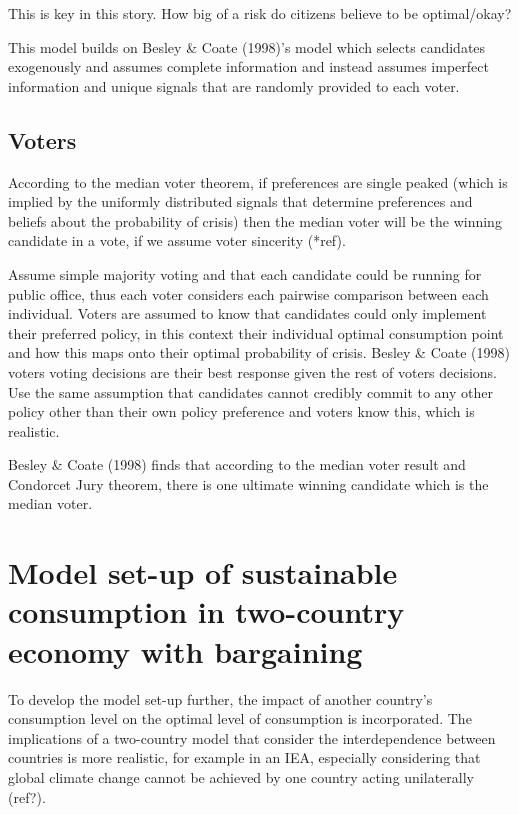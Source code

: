 \documentclass[11pt,preprint, authoryear]{elsarticle}
\numberwithin{equation}{section}
\numberwithin{figure}{section}
\numberwithin{table}{section}
\begin{document}
This is key in this story. How big of a risk do citizens believe to be
optimal/okay?

This model builds on Besley \& Coate (1998)'s model which selects
candidates exogenously and assumes complete information and instead
assumes imperfect information and unique signals that are randomly
provided to each voter.

\hypertarget{voters}{%
\subsection*{Voters}\label{voters}}

According to the median voter theorem, if preferences are single peaked
(which is implied by the uniformly distributed signals that determine
preferences and beliefs about the probability of crisis) then the median
voter will be the winning candidate in a vote, if we assume voter
sincerity (*ref).

Assume simple majority voting and that each candidate could be running
for public office, thus each voter considers each pairwise comparison
between each individual. Voters are assumed to know that candidates
could only implement their preferred policy, in this context their
individual optimal consumption point and how this maps onto their
optimal probability of crisis. Besley \& Coate (1998) voters voting
decisions are their best response given the rest of voters decisions.
Use the same assumption that candidates cannot credibly commit to any
other policy other than their own policy preference and voters know
this, which is realistic.

Besley \& Coate (1998) finds that according to the median voter result
and Condorcet Jury theorem, there is one ultimate winning candidate
which is the median voter.

\hypertarget{model-set-up-of-sustainable-consumption-in-two-country-economy-with-bargaining}{%
\section{Model set-up of sustainable consumption in two-country economy
with
bargaining}\label{model-set-up-of-sustainable-consumption-in-two-country-economy-with-bargaining}}

To develop the model set-up further, the impact of another country's
consumption level on the optimal level of consumption is incorporated.
The implications of a two-country model that consider the
interdependence between countries is more realistic, for example in an
IEA, especially considering that global climate change cannot be
achieved by one country acting unilaterally (ref?).
\end{document}
